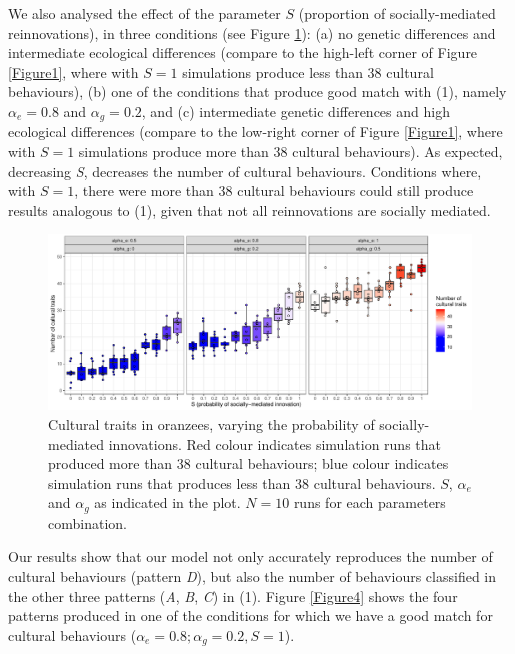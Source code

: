 \documentclass[9pt,twocolumn,twoside,]{pnas-new}
\begin{document}
We also analysed the effect of the parameter \(S\) (proportion of
socially-mediated reinnovations), in three conditions (see Figure
\ref{Figure3}): (a) no genetic differences and intermediate ecological
differences (compare to the high-left corner of Figure \ref{Figure1},
where with \(S=1\) simulations produce less than 38 cultural
behaviours), (b) one of the conditions that produce good match with (1),
namely \(\alpha_e=0.8\) and \(\alpha_g=0.2\), and (c) intermediate
genetic differences and high ecological differences (compare to the
low-right corner of Figure \ref{Figure1}, where with \(S=1\) simulations
produce more than 38 cultural behaviours). As expected, decreasing
\emph{S}, decreases the number of cultural behaviours. Conditions where,
with \(S=1\), there were more than 38 cultural behaviours could still
produce results analogous to (1), given that not all reinnovations are
socially mediated.

\begin{figure}[h!]
\begin{center}
\includegraphics[width=17.8cm]{figures/figure_3.pdf}
\caption{Cultural traits in oranzees, varying the probability of socially-mediated innovations. Red colour indicates simulation runs that produced more than 38 cultural behaviours; blue colour indicates simulation runs that produces less than 38 cultural behaviours. $S$, $\alpha_e$ and $\alpha_g$ as indicated in the plot. $N=10$ runs for each parameters combination.}
\label{Figure3}
\end{center}
\end{figure}

Our results show that our model not only accurately reproduces the
number of cultural behaviours (pattern \emph{D}), but also the number of
behaviours classified in the other three patterns (\emph{A}, \emph{B},
\emph{C}) in (1). Figure \ref{Figure4} shows the four patterns produced
in one of the conditions for which we have a good match for cultural
behaviours (\(\alpha_e=0.8;\alpha_g=0.2, S=1\)).
\end{document}
